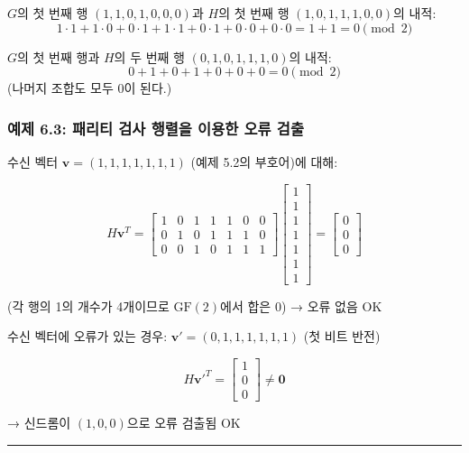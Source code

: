 \documentclass[
  oneside]{article}
\begin{document}
\(G\)의 첫 번째 행 \((1, 1, 0, 1, 0, 0, 0)\)과 \(H\)의 첫 번째 행
\((1, 0, 1, 1, 1, 0, 0)\)의 내적:
\[1 \cdot 1 + 1 \cdot 0 + 0 \cdot 1 + 1 \cdot 1 + 0 \cdot 1 + 0 \cdot 0 + 0 \cdot 0 = 1 + 1 = 0 \pmod{2}\]

\(G\)의 첫 번째 행과 \(H\)의 두 번째 행 \((0, 1, 0, 1, 1, 1, 0)\)의
내적: \[0 + 1 + 0 + 1 + 0 + 0 + 0 = 0 \pmod{2}\] (나머지 조합도 모두 0이
된다.)

\subsubsection{예제 6.3: 패리티 검사 행렬을 이용한 오류
검출}\label{uxc608uxc81c-6.3-uxd328uxb9acuxd2f0-uxac80uxc0ac-uxd589uxb82cuxc744-uxc774uxc6a9uxd55c-uxc624uxb958-uxac80uxcd9c}

수신 벡터 \(\mathbf{v} = (1, 1, 1, 1, 1, 1, 1)\) (예제 5.2의 부호어)에
대해:

\[H \mathbf{v}^T = \begin{bmatrix}
1 & 0 & 1 & 1 & 1 & 0 & 0 \\
0 & 1 & 0 & 1 & 1 & 1 & 0 \\
0 & 0 & 1 & 0 & 1 & 1 & 1
\end{bmatrix} \begin{bmatrix} 1\\1\\1\\1\\1\\1\\1 \end{bmatrix} = \begin{bmatrix} 0\\0\\0 \end{bmatrix}\]

(각 행의 1의 개수가 4개이므로 \(\text{GF}(2)\)에서 합은 0) → 오류 없음 OK

수신 벡터에 오류가 있는 경우: \(\mathbf{v}' = (0, 1, 1, 1, 1, 1, 1)\)
(첫 비트 반전)

\[H \mathbf{v}'^T = \begin{bmatrix} 1\\0\\0 \end{bmatrix} \neq \mathbf{0}\]

→ 신드롬이 \((1, 0, 0)\)으로 오류 검출됨 OK

\begin{center}\rule{0.5\linewidth}{0.5pt}\end{center}
\end{document}
